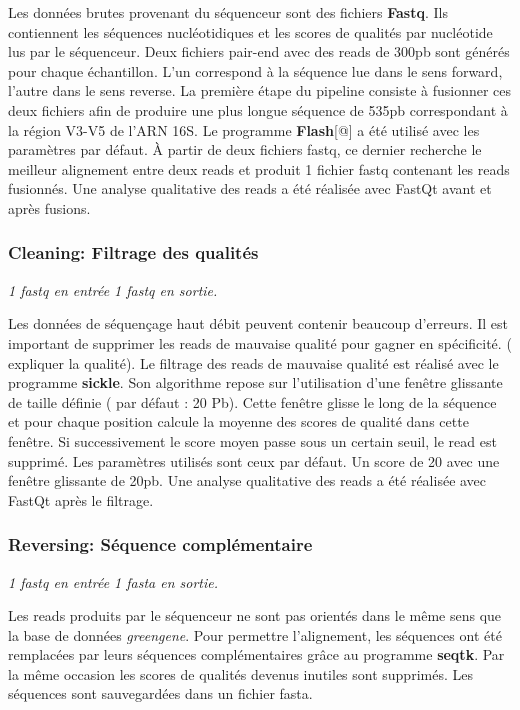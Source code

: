 \documentclass[12pt,a4paper]{article}
\begin{document}
Les données brutes provenant du séquenceur sont des fichiers \textbf{Fastq}. Ils contiennent les séquences nucléotidiques et les scores de qualités par nucléotide lus par le séquenceur. Deux fichiers pair-end avec des reads de 300pb sont générés pour chaque échantillon. L’un correspond à la séquence lue dans le sens forward, l’autre dans le sens reverse.
La première étape du pipeline consiste à fusionner ces deux fichiers afin de produire une plus longue séquence de 535pb correspondant à la région V3-V5 de l’ARN 16S.
Le programme \textbf{Flash}[@] a été utilisé avec les paramètres par défaut. À partir de deux fichiers fastq, ce dernier recherche le meilleur alignement entre deux reads et produit 1 fichier fastq contenant les reads fusionnés.
Une analyse qualitative des reads a été réalisée avec FastQt\citep{Beck} avant et après fusions.

\subsubsection{Cleaning: Filtrage des qualités}\begin{center}\emph{1 fastq en entrée 1 fastq en sortie. } \end{center}

Les données de séquençage haut débit peuvent contenir beaucoup d'erreurs. Il est important de supprimer les reads de mauvaise qualité pour gagner en spécificité. ( expliquer la qualité).
Le filtrage des reads de mauvaise qualité est réalisé avec le programme \textbf{sickle}. Son algorithme repose sur l'utilisation d'une fenêtre glissante de taille définie ( par défaut : 20 Pb). Cette fenêtre glisse le long de la séquence et pour chaque position calcule la moyenne des scores de qualité dans cette fenêtre. Si successivement le score moyen passe sous un certain seuil, le read est supprimé. Les paramètres utilisés sont ceux par défaut. Un score de 20 avec une fenêtre glissante de 20pb. 
Une analyse qualitative des reads a été réalisée avec FastQt\citep{Beck} après le filtrage. 


\subsubsection{Reversing: Séquence complémentaire}\begin{center}\emph{1 fastq en entrée 1 fasta en sortie. } \end{center}

Les reads produits par le séquenceur ne sont pas orientés dans le même sens que la base de données \textit{greengene}. Pour permettre l'alignement, les séquences ont été remplacées par leurs séquences complémentaires grâce au programme \textbf{seqtk}. 
Par la même occasion les scores de qualités devenus inutiles sont supprimés. Les séquences sont sauvegardées dans un fichier fasta. 
\end{document}
